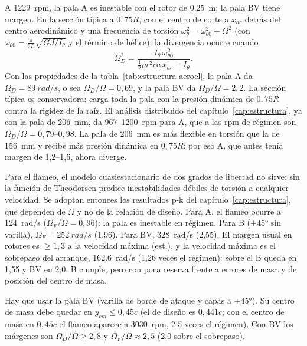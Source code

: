 A \num{1229}~rpm, la pala A es inestable con el rotor de \SI{0.25}{m}; la pala BV tiene
margen. En la sección
típica a $0{,}75R$, con el centro de corte a $x_{ac}$ detrás del centro aerodinámico y una
frecuencia de torsión
$\omega_\theta^2=\omega_{\theta0}^2+\Omega^2$ (con
$\omega_{\theta0}=\tfrac{\pi}{2L}\sqrt{GJ/I_\theta}$ y el término de hélice), la divergencia
ocurre cuando
\begin{equation}
  \Omega_D^2=\frac{I_\theta\,\omega_{\theta0}^2}{\tfrac12\rho r^2ca\,x_{ac}-I_\theta}.
  \label{eq:estabilidad-div}
\end{equation}
Con las propiedades de la tabla~\ref{tab:estructura-aeroel}, la pala A da
$\Omega_D=\SI{89}{rad/s}$, o sea $\Omega_D/\Omega=0{,}69$, y la pala BV da
$\Omega_D/\Omega=2{,}2$. La sección típica es conservadora: carga toda la pala con la
presión dinámica de $0{,}75R$ contra la rigidez de la raíz. El análisis distribuido del
capítulo~\ref{cap:estructura}, ya con la pala de \SI{206}{mm}, da \num{967}--\num{1200}~rpm
para A, que a las rpm de régimen son $\Omega_D/\Omega=0{,}79$--$0{,}98$. La pala de
\SI{206}{mm} es más flexible en torsión que la de \SI{156}{mm} y recibe más presión
dinámica en $0{,}75R$: por eso A, que antes tenía margen de 1,2--1,6, ahora diverge.

Para el flameo, el modelo cuasiestacionario de dos grados de libertad no sirve: sin la
función de Theodorsen predice inestabilidades débiles de torsión a cualquier velocidad.
Se adoptan entonces los resultados p-k del capítulo~\ref{cap:estructura}, que dependen
de $\Omega$ y no de la relación de diseño. Para A, el flameo ocurre a \SI{124}{rad/s}
($\Omega_F/\Omega=0{,}96$): la pala es inestable en régimen. Para B ($\pm\ang{45}$ sin
varilla), $\Omega_F=\SI{252}{rad/s}$ (1,96). Para BV, \SI{328}{rad/s} (2,55). El margen usual
en rotores es $\ge1{,}3$ a la velocidad máxima (est.), y la velocidad máxima es el
sobrepaso del arranque, \SI{162.6}{rad/s} (1,26 veces el régimen): sobre él B queda en 1,55
y BV en 2,0. B cumple, pero con poca reserva frente a errores de masa y de posición del
centro de masa.

\begin{resultado}[Aeroelasticidad]
Hay que usar la pala BV (varilla de borde de ataque y capas a $\pm\ang{45}$). Su centro
de masa debe quedar en $y_{cm}\le0{,}45c$ (el de diseño es $0{,}441c$; con el centro de masa en $0{,}45c$ el flameo
aparece a \num{3030}~rpm, 2,5 veces el régimen). Con BV los márgenes son
$\Omega_D/\Omega\ge2{,}8$ y $\Omega_F/\Omega\approx2{,}5$ (2,0 sobre el sobrepaso).
\end{resultado}

